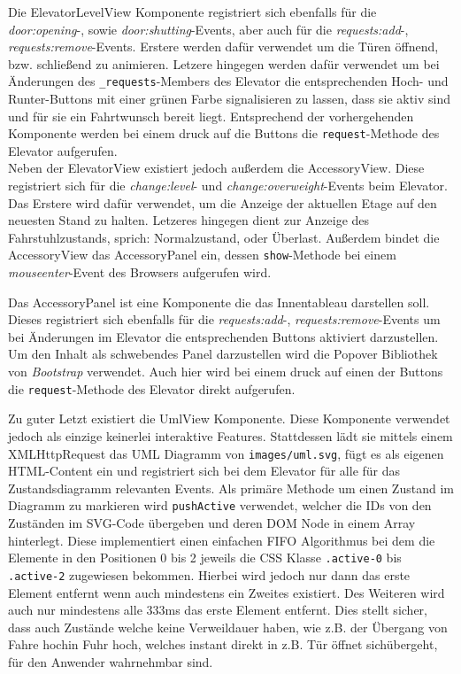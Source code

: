 Die ElevatorLevelView Komponente registriert sich ebenfalls für die \textit{door:opening}-, sowie \textit{door:shutting}-Events, aber auch für die \textit{requests:add}-, \textit{requests:remove}-Events.
Erstere werden dafür verwendet um die Türen öffnend, bzw. schließend zu animieren.
Letzere hingegen werden dafür verwendet um bei Änderungen des \texttt{\_requests}-Members des Elevator die entsprechenden Hoch- und Runter-Buttons mit einer grünen Farbe signalisieren zu lassen, dass sie aktiv sind und für sie ein Fahrtwunsch bereit liegt.
Entsprechend der vorhergehenden Komponente werden bei einem druck auf die Buttons die \texttt{request}-Methode des Elevator aufgerufen. \\

Neben der ElevatorView existiert jedoch außerdem die AccessoryView.
Diese registriert sich für die \textit{change:level}- und \textit{change:overweight}-Events beim Elevator.
Das Erstere wird dafür verwendet, um die Anzeige der aktuellen Etage auf den neuesten Stand zu halten.
Letzeres hingegen dient zur Anzeige des Fahrstuhlzustands, sprich: Normalzustand, oder Überlast.
Außerdem bindet die AccessoryView das AccessoryPanel ein, dessen \texttt{show}-Methode bei einem \textit{mouseenter}-Event des Browsers aufgerufen wird.

Das AccessoryPanel ist eine Komponente die das Innentableau darstellen soll.
Dieses registriert sich ebenfalls für die \textit{requests:add}-, \textit{requests:remove}-Events um bei Änderungen im Elevator die entsprechenden Buttons aktiviert darzustellen.
Um den Inhalt als schwebendes Panel darzustellen wird die Popover Bibliothek von \textit{Bootstrap} verwendet.
Auch hier wird bei einem druck auf einen der Buttons die \texttt{request}-Methode des Elevator direkt aufgerufen.

Zu gu­ter Letzt existiert die UmlView Komponente.
Diese Komponente verwendet jedoch als einzige keinerlei interaktive Features.
Stattdessen lädt sie mittels einem XMLHttpRequest das UML Diagramm von \texttt{images/uml.svg}, fügt es als eigenen HTML-Content ein und registriert sich bei dem Elevator für alle für das Zustandsdiagramm relevanten Events.
Als primäre Methode um einen Zustand im Diagramm zu markieren wird \texttt{pushActive} verwendet, welcher die IDs von den Zuständen im SVG-Code übergeben und deren DOM Node in einem Array hinterlegt.
Diese implementiert einen einfachen FIFO Algorithmus bei dem die Elemente in den Positionen 0 bis 2 jeweils die CSS Klasse \texttt{.active-0} bis \texttt{.active-2} zugewiesen bekommen.
Hierbei wird jedoch nur dann das erste Element entfernt wenn auch mindestens ein Zweites existiert.
Des Weiteren wird auch nur mindestens alle 333ms das erste Element entfernt.
Dies stellt sicher, dass auch Zustände welche keine Verweildauer haben, wie z.B. der Übergang von \glqq Fahre hoch\grqq in \glqq Fuhr hoch\grqq, welches instant direkt in z.B. \glqq Tür öffnet sich\grqq übergeht, für den Anwender wahrnehmbar sind.


